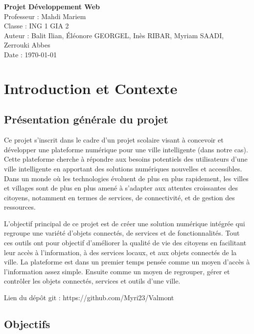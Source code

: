 \documentclass[a4paper,12pt]{report}
\begin{document}
	
	\begin{titlepage}
		
		\centering
		\vspace*{2cm}
		\Huge{\textbf{Projet Développement Web}} \\[1cm]
		\Large{Professeur : Mahdi Mariem} \\[2cm]
		\vfill
		\Large{
			Classe : ING 1 GIA 2 \\
			Auteur : Balit Ilian, Éléonore GEORGEL, Inès RIBAR, Myriam SAADI, Zerrouki Abbes \\
			Date : \today \\
		}
	\end{titlepage}
	
	\tableofcontents
	\newpage
	
	\section{Introduction et Contexte}
	
	\subsection{Présentation générale du projet}
	
	Ce projet s'inscrit dans le cadre d'un projet scolaire visant à concevoir et développer une plateforme numérique pour une ville intelligente (dans notre cas). Cette plateforme cherche à répondre aux besoins potentiels des utilisateurs d'une ville intelligente en apportant des solutions numériques nouvelles et accessibles. Dans un monde où les technologies évoluent de plus en plus rapidement, les villes et villages sont de plus en plus amené à s'adapter aux attentes croissantes des citoyens, notamment en termes de services, de connectivité, et de gestion des ressources.
	
	L’objectif principal de ce projet est de créer une solution numérique intégrée qui regroupe une variété d'objets connectés, de services et de fonctionnalités. Tout ces outils ont pour objectif d'améliorer la qualité de vie des citoyens en facilitant leur accès à l’information, à des services locaux, et aux objets connectés de la ville. La plateforme est dans un premier temps pensée comme un moyen d'accès à l'information assez simple. Ensuite comme un moyen de regrouper, gérer et contrôler les objets connectés, services et outils d'une ville.
	
	Lien du dépôt git : https://github.com/Myri23/Valmont
	\subsection{Objectifs}
	
\end{document}
